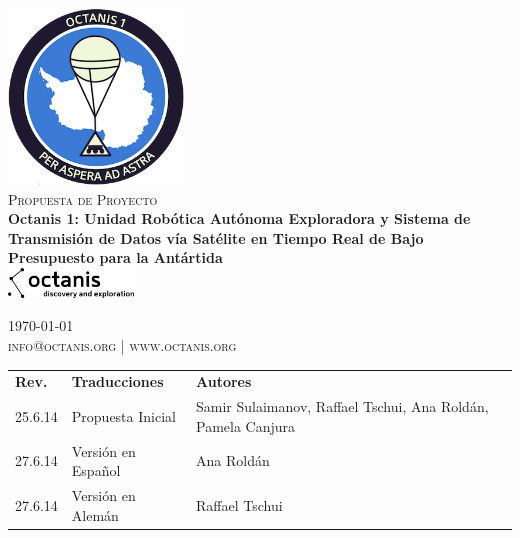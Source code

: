 \documentclass[a4paper,12pt]{article}
\begin{document}
\begin{titlepage}
\begin{center}

\includegraphics[width=0.35\textwidth]{patch}~\\[2cm]

\textsc{\Large Propuesta de Proyecto}\\[0.5cm]

\huge \bfseries Octanis 1: Unidad Robótica Autónoma Exploradora y Sistema de Transmisión de Datos vía Satélite en Tiempo Real de Bajo Presupuesto para la Antártida \\[0.4cm] 

\vspace{23pt}
\includegraphics[width=0.25\textwidth]{black_logo} \\
\vfill

{\large \today} \\
\textsc{\small info@octanis.org | www.octanis.org}
\vspace{50pt}


\begin{table}[h!]
\centering
\vspace{1pt}
\begin{tabular}{ l  l  l }
	\textbf{Rev.} & \textbf{Traducciones} & \textbf{Autores} \\
	25.6.14 & Propuesta Inicial & Samir Sulaimanov, Raffael Tschui, Ana Roldán, Pamela Canjura \\
	27.6.14 & Versión en Español & Ana Roldán \\
	27.6.14 & Versión en Alemán & Raffael Tschui \\
\end{tabular}
\end{table}

\end{center}
\end{titlepage}
\end{document}

